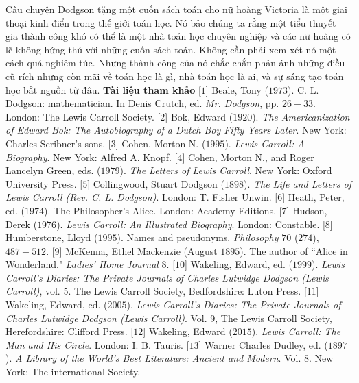 \begin{multicols}{2}
	\vskip 0.1cm
	Câu chuyện Dodgson tặng một cuốn sách toán cho nữ hoàng Victoria là một giai thoại kinh điển trong thế giới toán học. Nó bảo chúng ta rằng một tiểu thuyết gia thành công khó có thể là một nhà toán học chuyên nghiệp và các nữ hoàng có lẽ không hứng thú với những cuốn sách toán. Không cần phải xem xét nó một cách quá nghiêm túc. Nhưng  thành công của nó chắc chắn phản ánh những điều cũ rích nhưng còn mãi về toán học là gì, nhà toán học là ai, và sự sáng tạo toán học bắt nguồn từ đâu.
	\vskip 0.1cm
	\textbf{\color{quantoan}Tài liệu tham khảo} 
	\vskip 0.1cm
	[$1$]	Beale, Tony ($1973$). C. L. Dodgson: mathematician. In Denis Crutch, ed. \textit{Mr. Dodgson}, pp. $26-33$. London: The Lewis Carroll Society.
	\vskip 0.1cm
	[$2$]	Bok, Edward ($1920$). \textit{The Americanization of Edward Bok: The Autobiography of a Dutch Boy Fifty Years Later}. New York: Charles Scribner’s sons.
	\vskip 0.1cm
	[$3$]	Cohen, Morton N. ($1995$). \textit{Lewis Carroll: A Biography}. New York: Alfred A. Knopf.
	\vskip 0.1cm
	[$4$]	Cohen, Morton N., and Roger Lancelyn Green, eds. ($1979$). \textit{The Letters of Lewis Carroll}. New York: Oxford University Press.
	\vskip 0.1cm
	[$5$]	Collingwood, Stuart Dodgson ($1898$). \textit{The Life and Letters of Lewis Carroll (Rev. C. L. Dodgson)}. London: T. Fisher Unwin.
	\vskip 0.1cm
	[$6$]	Heath, Peter, ed. ($1974$). The Philosopher’s Alice. London: Academy Editions.
	\vskip 0.1cm
	[$7$]	Hudson, Derek ($1976$). \textit{Lewis Carroll: An Illustrated Biography}. London: Constable.
	\vskip 0.1cm
	[$8$]	Humberstone, Lloyd ($1995$). Names and pseudonyms. \textit{Philosophy} $70$ ($274$), $487-512$.
	\vskip 0.1cm
	[$9$]	McKenna, Ethel Mackenzie (August $1895$). The author of ``Alice in Wonderland." \textit{Ladies’ Home Journal} $8$.
	\vskip 0.1cm
	[$10$]	Wakeling, Edward, ed. ($1999$). \textit{Lewis Carroll’s Diaries: The Private Journals of Charles Lutwidge Dodgson (Lewis Carroll)}, vol. $5$. The Lewis Carroll Society, Bedfordshire: Luton Press.
	\vskip 0.1cm
	[$11$]	Wakeling, Edward, ed. ($2005$). \textit{Lewis Carroll’s Diaries: The Private Journals of Charles Lutwidge Dodgson (Lewis Carroll)}. Vol. $9$, The Lewis Carroll Society, Herefordshire: Clifford Press.
	\vskip 0.1cm
	[$12$]	Wakeling, Edward ($2015$). \textit{Lewis Carroll: The Man and His Circle}. London: I. B. Tauris.
	\vskip 0.1cm
	[$13$]	Warner Charles Dudley, ed. ($1897$). \textit{A Library of the World’s Best Literature: Ancient and Modern}. Vol. $8$. New York: The international Society.
\end{multicols}